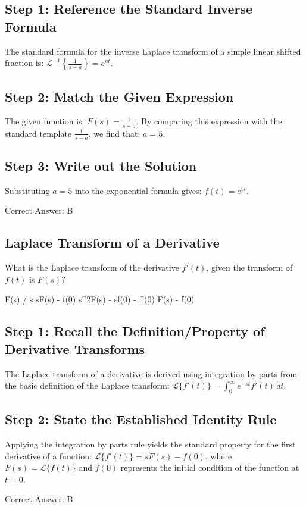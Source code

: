 \begin{solution}

\subsection*{Step 1: Reference the Standard Inverse Formula}
The standard formula for the inverse Laplace transform of a simple linear shifted fraction is: $\mathcal{L}^{-1}\left\{\frac{1}{s-a}\right\} = e^{at}$.

\subsection*{Step 2: Match the Given Expression}
The given function is: $F(s) = \frac{1}{s-5}$. By comparing this expression with the standard template $\frac{1}{s-a}$, we find that: $a = 5$.

\subsection*{Step 3: Write out the Solution}
Substituting $a = 5$ into the exponential formula gives: $f(t) = e^{5t}$.

Correct Answer: B
\end{solution}

\clearpage

\subsection{Laplace Transform of a Derivative}

What is the Laplace transform of the derivative $f'(t)$, given the transform of $f(t)$ is $F(s)$?

\begin{choices}
    \choice F(s) / s
    \correctchoice sF(s) - f(0)
    \choice s^2F(s) - sf(0) - f'(0)
    \choice F(s) - f(0)
\end{choices}

\begin{solution}

\subsection*{Step 1: Recall the Definition/Property of Derivative Transforms}
The Laplace transform of a derivative is derived using integration by parts from the basic definition of the Laplace transform: $\mathcal{L}\{f'(t)\} = \int_{0}^{\infty} e^{-st} f'(t) \, dt$.

\subsection*{Step 2: State the Established Identity Rule}
Applying the integration by parts rule yields the standard property for the first derivative of a function: $\mathcal{L}\{f'(t)\} = sF(s) - f(0)$, where $F(s) = \mathcal{L}\{f(t)\}$ and $f(0)$ represents the initial condition of the function at $t = 0$.

Correct Answer: B
\end{solution}

